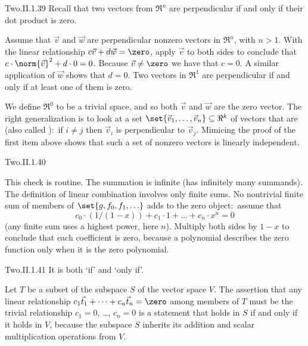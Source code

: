 \begin{ans}{Two.II.1.39}
      Recall that two vectors from \( \Re^n \) are perpendicular if and
      only if their dot product is zero.
      \begin{exparts}
         \partsitem Assume that \( \vec{v} \) and \( \vec{w} \) are
           perpendicular nonzero vectors in $\Re^n$, with \( n>1 \).
           With the linear relationship \( c\vec{v}+d\vec{w}=\zero \),
           apply \( \vec{v} \) to both
           sides to conclude that \( c\cdot\norm{\vec{v}}^2+d\cdot 0=0 \).
           Because \( \vec{v}\neq\zero \) we have that \( c=0 \).
           A similar application of \( \vec{w} \) shows that \( d=0 \).
         \partsitem Two vectors in \( \Re^1 \) are perpendicular if and only if
           at least one of them is zero.

           We define \( \Re^0 \) to be a trivial space, and so both $\vec{v}$
           and $\vec{w}$ are the zero vector.
         \partsitem The right generalization is to look at a set
           \( \set{\vec{v}_1,\dots,\vec{v}_n}\subseteq\Re^k \) of vectors
           that are 
           (also called ):~if
           \( i\neq j \) then \( \vec{v}_i \) is perpendicular to
           \( \vec{v}_j \).
           Mimicing the proof of the first item above shows that such a set of
           nonzero vectors is linearly independent.
      \end{exparts}
    
\end{ans}
\begin{ans}{Two.II.1.40}
      \begin{exparts}
        \partsitem This check is routine.
        \partsitem The summation is infinite (has infinitely many summands).
          The definition of linear combination involves only finite sums.
        \partsitem No nontrivial finite sum of members of
           \( \set{g,f_0,f_1,\ldots} \) adds to the zero object:~assume that
           \begin{equation*}
              c_0\cdot (1/(1-x))+c_1\cdot 1+\dots+c_n\cdot x^n=0
           \end{equation*}
           (any finite sum uses a highest power, here \( n \)).
           Multiply both sides by \( 1-x \) to conclude that each coefficient
           is zero, because a polynomial describes the zero function only when
           it is the zero polynomial.
      \end{exparts}
     
\end{ans}
\begin{ans}{Two.II.1.41}
      It is both `if' and `only if'.

      Let \( T \) be a subset of the subspace \( S \) of the vector space
      \( V \).
      The assertion that any linear relationship
      $c_1\vec{t}_1+\dots+c_n\vec{t}_n=\zero$ among members of \( T \)
      must be the trivial relationship $c_1=0$, \ldots, $c_n=0$
      is a statement that
      holds in \( S \) if and only if it holds in \( V \),
      because the subspace \( S \) inherits its addition and
      scalar multiplication operations from \( V \).
    
\end{ans}
